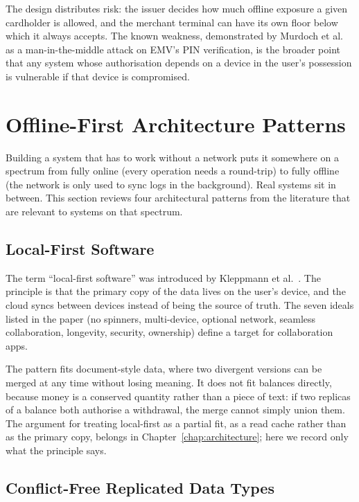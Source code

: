 The design distributes risk: the issuer decides how much offline exposure a given cardholder is allowed, and the merchant terminal can have its own floor below which it always accepts. The known weakness, demonstrated by Murdoch et al.~\cite{Murdoch2010} as a man-in-the-middle attack on EMV's PIN verification, is the broader point that any system whose authorisation depends on a device in the user's possession is vulnerable if that device is compromised.

\section{Offline-First Architecture Patterns}
\label{sec:offline-first}

Building a system that has to work without a network puts it somewhere on a spectrum from fully online (every operation needs a round-trip) to fully offline (the network is only used to sync logs in the background). Real systems sit in between. This section reviews four architectural patterns from the literature that are relevant to systems on that spectrum.

\subsection{Local-First Software}
\label{subsec:local-first}

The term ``local-first software'' was introduced by Kleppmann et al.~\cite{Kleppmann2019}. The principle is that the primary copy of the data lives on the user's device, and the cloud syncs between devices instead of being the source of truth. The seven ideals listed in the paper (no spinners, multi-device, optional network, seamless collaboration, longevity, security, ownership) define a target for collaboration apps.

The pattern fits document-style data, where two divergent versions can be merged at any time without losing meaning. It does not fit balances directly, because money is a conserved quantity rather than a piece of text: if two replicas of a balance both authorise a withdrawal, the merge cannot simply union them. The argument for treating local-first as a partial fit, as a read cache rather than as the primary copy, belongs in Chapter~\ref{chap:architecture}; here we record only what the principle says.

\subsection{Conflict-Free Replicated Data Types}
\label{subsec:crdts}

